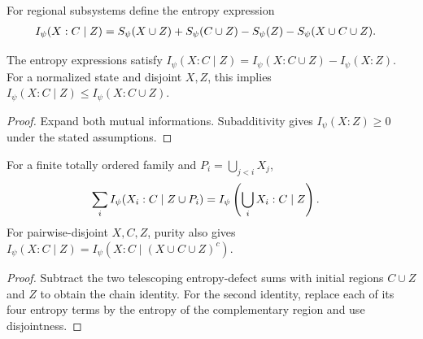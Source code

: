 \begin{definition}
    \label{def:finite_product_conditional_information}
    \leanok
    For regional subsystems define the entropy expression
    \begin{align}
        I_\psi(X:C\mid Z)
        &=S_\psi(X\cup Z)+S_\psi(C\cup Z)-S_\psi(Z)-S_\psi(X\cup C\cup Z).
        \notag
    \end{align}
\end{definition}

\begin{theorem}
    \label{thm:finite_product_conditional_difference}
    \leanok
    The entropy expressions satisfy
    $I_\psi(X:C\mid Z)=I_\psi(X:C\cup Z)-I_\psi(X:Z)$.
    For a normalized state and disjoint $X,Z$, this implies
    $I_\psi(X:C\mid Z)\le I_\psi(X:C\cup Z)$.
\end{theorem}
\begin{proof}\leanok
    Expand both mutual informations. Subadditivity gives
    $I_\psi(X:Z)\ge0$ under the stated assumptions.
\end{proof}

\begin{theorem}
    \label{thm:finite_product_conditional_chain_duality}
    \leanok
    For a finite totally ordered family and $P_i=\bigcup_{j<i}X_j$,
    \begin{align}
        \sum_i I_\psi(X_i:C\mid Z\cup P_i)
        &=I_\psi\left(\bigcup_i X_i:C\mid Z\right).
        \notag
    \end{align}
    For pairwise-disjoint $X,C,Z$, purity also gives
    $I_\psi(X:C\mid Z)=I_\psi(X:C\mid (X\cup C\cup Z)^c)$.
\end{theorem}
\begin{proof}\leanok
    Subtract the two telescoping entropy-defect sums with initial regions
    $C\cup Z$ and $Z$ to obtain the chain identity. For the second identity,
    replace each of its four entropy terms by the entropy of the complementary
    region and use disjointness.
\end{proof}

